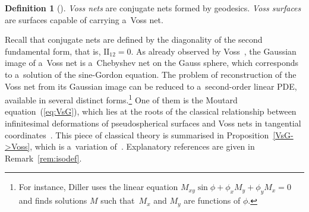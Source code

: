 \documentclass[pdftex]{sigma}
\def\eqref#1{{\rm(\ref{#1})}}
\numberwithin{equation}{section}
\theoremstyle{definition}
\newtheorem{Definition}[Theorem]{Definition}
\begin{document}
\begin{Definition}[\cite{AV-1888}]
{\it Voss nets} are conjugate nets formed by geodesics.
{\it Voss surfaces} are surfaces capable of carrying a~Voss net.
\end{Definition}


Recall that conjugate nets are defined by the diagonality of
the second fundamental form, that is, $\mathrm{II}_{12} = 0$.
As already observed by Voss~\cite{AV-1888},
the Gaussian image of a~Voss net is a~Chebyshev net on the
Gauss sphere, which corresponds to a~solution of the sine-Gordon equation.
The problem of reconstruction of the Voss net
from its Gaussian image can be reduced to a~second-order linear PDE,
available in several distinct forms.\footnote{For instance,
Diller uses the linear equation
$M_{xy} \sin\phi + \phi_x M_y + \phi_y M_x = 0$
and finds solutions $M$ such that~$M_x$ and $M_y$ are functions of
$\phi$.}
One of them is the Moutard equation~\eqref{eq:VsG}, which lies
at the roots of the classical relationship between infinitesimal
deformations of pseudospherical surfaces and Voss nets in tangential
coordinates~\cite{Bia-II,LPE-1909,Izm}.
This piece of classical theory is summarised in
Proposition~\ref{VsG->Voss}, which is a~variation of~\cite[Theorem~2.25]{Izm}.
Explanatory references are given in Remark~\ref{rem:isodef}.
\end{document}
